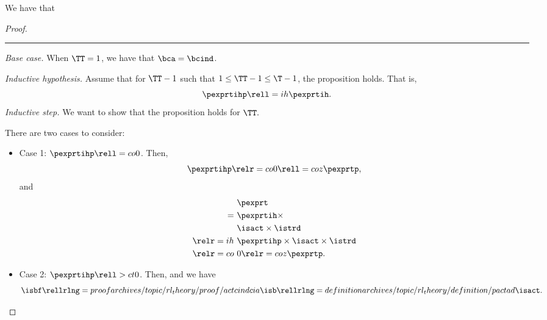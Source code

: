 \begin{proposition}
  We have that %
\end{proposition}

\begin{proof}
  \hrule
  {\it Base case.}
  When $\TT = 1$,
  we have  that
  $\bca = \bcind$.

  \srule
  {\it Inductive hypothesis.}
  Assume that for $\TT - 1$ such that $1 \le \TT - 1 \le \T - 1$,
  the proposition holds. That is,
  $$ \pexprtihp \rell = ih \pexprtih.$$%
  \srule
  {\it Inductive step.}
  We want to show that the proposition holds for $\TT.$

  There are two cases to consider:
  \begin{itemize}
    \item Case 1: $\pexprtihp \rell = co 0$. 
      Then,
      $$\pexprtihp \relr = co 0 \rell = coz \pexprtp,$$
      and
      \begin{align*}
        &\pexprt \\
        =\ &\pexprtih \times \\
        &\isact \times \istrd\\
        \relr = ih \ & \pexprtihp \times \isact \times \istrd \\
        \relr = co \ & 0 \relr = coz \pexprtp.
      \end{align*}
    \item Case 2: $\pexprtihp \rell > ct 0$. 
      Then, 
      and we have
      $$\isbf \rellrlng = proof archives/topic/rl_theory/proof/actcind cia \isb 
      \rellrlng = definition archives/topic/rl_theory/definition/pact ad \isact.$$


\end{itemize}
\end{proof}
